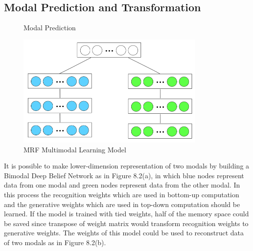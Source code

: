 \documentclass[12pt]{article}
\begin{document}
\subsection{Modal Prediction and Transformation}
\begin{figure}[!t]
\centering
{}
\caption{Modal Prediction}
\label{fig5}
\end{figure}
\begin{figure}[h]
\centering
\includegraphics[height=2.2in]{DBMmodals.png}
\caption{MRF Multimodal Learning Model} \label{fig:side:a}
\end{figure}
It is possible to make lower-dimension representation of two modals by building a Bimodal Deep Belief Network as in Figure 8.2(a), in which blue nodes represent data from one modal and green nodes represent data from the other modal. In this process the recognition weights which are used in bottom-up computation and the generative weights which are used in top-down computation should be learned. If the model is trained with tied weights, half of the memory space could be saved since transpose of weight matrix would transform recognition weights to generative weights. The weights of this model could be used to reconstruct data of two modals as in Figure 8.2(b).\\
\end{document}
